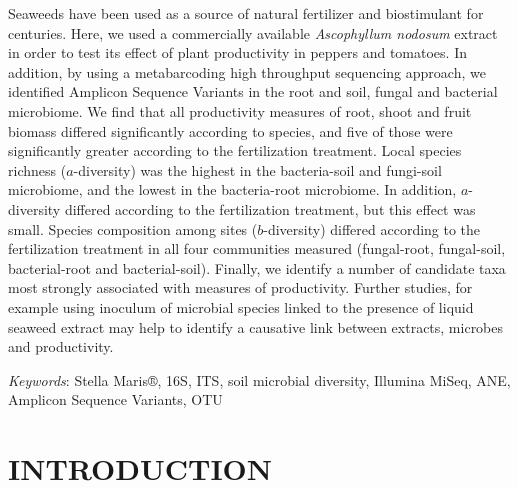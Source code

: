 \documentclass[11pt,]{article}
\renewenvironment{abstract}
 {{%
    \setlength{\leftmargin}{0mm}
    \setlength{\rightmargin}{\leftmargin}%
  }%
  \relax}
 {\endlist}
\begin{document}
\begin{abstract}

    \hbox{\vrule height .2pt width 39.14pc}

    \vskip 8.5pt %

\noindent Seaweeds have been used as a source of natural fertilizer and
biostimulant for centuries. Here, we used a commercially available
\emph{Ascophyllum nodosum} extract in order to test its effect of plant
productivity in peppers and tomatoes. In addition, by using a
metabarcoding high throughput sequencing approach, we identified
Amplicon Sequence Variants in the root and soil, fungal and bacterial
microbiome. We find that all productivity measures of root, shoot and
fruit biomass differed significantly according to species, and five of
those were significantly greater according to the fertilization
treatment. Local species richness (\(a\)-diversity) was the highest in
the bacteria-soil and fungi-soil microbiome, and the lowest in the
bacteria-root microbiome. In addition, \(a\)-diversity differed
according to the fertilization treatment, but this effect was small.
Species composition among sites (\(b\)-diversity) differed according to
the fertilization treatment in all four communities measured
(fungal-root, fungal-soil, bacterial-root and bacterial-soil). Finally,
we identify a number of candidate taxa most strongly associated with
measures of productivity. Further studies, for example using inoculum of
microbial species linked to the presence of liquid seaweed extract may
help to identify a causative link between extracts, microbes and
productivity.


\vskip 8.5pt \noindent \emph{Keywords}: Stella Maris®, 16S, ITS, soil microbial diversity, Illumina MiSeq, ANE,
Amplicon Sequence Variants, OTU \par

    \hbox{\vrule height .2pt width 39.14pc}



\end{abstract}


\vskip 6.5pt


\noindent \doublespacing \newpage 

\section{INTRODUCTION}\label{introduction}
\end{document}
